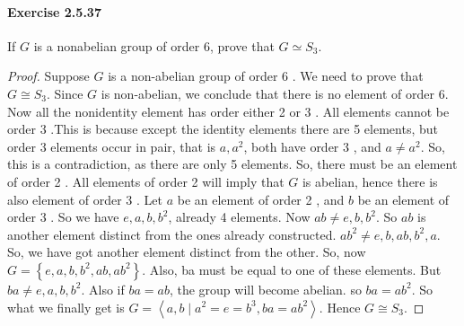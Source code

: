 \documentclass{article}
\begin{document}
\paragraph{Exercise 2.5.37} If $G$ is a nonabelian group of order 6, prove that $G \simeq S_3$.
\begin{proof}
    Suppose $G$ is a non-abelian group of order 6 . We need to prove that $G \cong S_3$. Since $G$ is non-abelian, we conclude that there is no element of order 6. Now all the nonidentity element has order either 2 or 3 . All elements cannot be order 3 .This is because except the identity elements there are 5 elements, but order 3 elements occur in pair, that is $a, a^2$, both have order 3 , and $a \neq a^2$. So, this is a contradiction, as there are only 5 elements. So, there must be an element of order 2 . All elements of order 2 will imply that $G$ is abelian, hence there is also element of order 3 . Let $a$ be an element of order 2 , and $b$ be an element of order 3 . So we have $e, a, b, b^2$, already 4 elements. Now $a b \neq e, b, b^2$. So $a b$ is another element distinct from the ones already constructed. $a b^2 \neq e, b, a b, b^2, a$. So, we have got another element distinct from the other. So, now $ G=\left\{e, a, b, b^2, a b, a b^2\right\}$. Also, ba must be equal to one of these elements. But $b a \neq e, a, b, b^2$. Also if $b a=a b$, the group will become abelian. so $b a=a b^2$. So what we finally get is $G=\left\langle a, b \mid a^2=e=b^3, b a=a b^2\right\rangle$. Hence $G \cong S_3$.
\end{proof}
\end{document}
